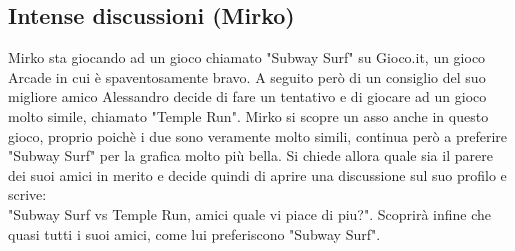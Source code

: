 \documentclass[../Report.tex]{subfiles}
\begin{document}
    \subsection{Intense discussioni (Mirko)}
    Mirko sta giocando ad un gioco chiamato "Subway Surf" su Gioco.it, un gioco Arcade in cui è spaventosamente bravo. A seguito però di un consiglio del suo migliore amico Alessandro decide di fare un tentativo e di giocare ad un gioco molto simile, chiamato "Temple Run". Mirko si scopre un asso anche in questo gioco, proprio poichè i due sono veramente molto simili, continua però a preferire "Subway Surf" per la grafica molto più bella. Si chiede allora quale sia il parere dei suoi amici in merito e decide quindi di aprire una discussione sul suo profilo e scrive:\\
    "Subway Surf vs Temple Run, amici quale vi piace di piu?". Scoprirà infine che quasi tutti i suoi amici, come lui preferiscono "Subway Surf".
\end{document}
